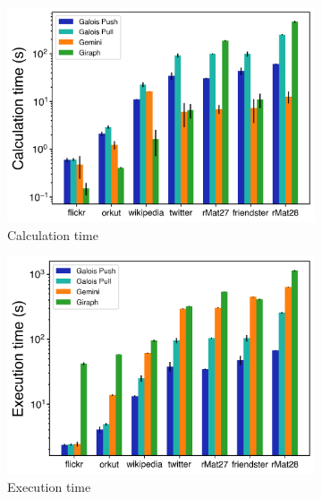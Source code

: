 \documentclass{meetings}
\begin{document}
\begin{figure}
	\hfil
	\begin{subfigure}{0.32\textwidth}
		\includegraphics[width=\linewidth]{../../plots/distributedBFS_calcTime.png}
		\caption{Calculation time}
		\label{fig:distributedBFS_calc}
	\end{subfigure}
	\hfil
	\begin{subfigure}{0.32\textwidth}
		\includegraphics[width=\linewidth]{../../plots/distributedBFS_execTime.png}
		\caption{Execution time}
		\label{fig:distributedBFS_exec}
	\end{subfigure}
	\hfil
	\begin{subfigure}{0.32\textwidth}

\end{subfigure}
\end{figure}
\end{document}

